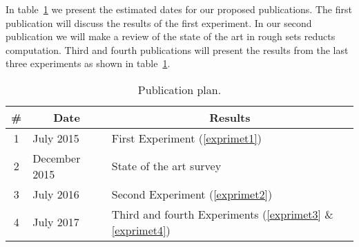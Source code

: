 \documentclass[11pt]{article}   %
\begin{document}
  In table~\ref{tab_PP} we present the estimated dates for our proposed publications. The first publication will
  discuss the results of the first experiment. In our second publication we will make a review of the state of 
  the art in rough sets reducts computation. Third and fourth publications will present the results from the last
  three experiments as shown in table~\ref{tab_PP}.
  
     \begin{table}[htb]
		\caption{Publication plan.} \label{tab_PP}
		\centering
 	\begin{tabular}{c||l|l}
 		\# & \multicolumn{1}{c|}{Date} & \multicolumn{1}{c}{Results}\\
 		\hline \hline
		1 & July 2015 & First Experiment (\ref{exprimet1})\\
		2 & December 2015 & State of the art survey \\
		3 & July 2016 & Second Experiment (\ref{exprimet2})\\
		4 & July 2017 & Third and fourth Experiments (\ref{exprimet3} \& \ref{exprimet4})\\
 	\end{tabular}             
 	\end{table}
\end{document}
